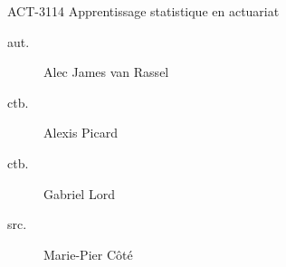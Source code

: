 \begin{contrib}{ACT-3114\: Apprentissage statistique en actuariat}
\begin{description}
	\item[aut.] Alec James van Rassel
	\item[ctb.]	Alexis Picard
	\item[ctb.]	Gabriel Lord
	\item[src.] Marie-Pier Côté
\end{description}
\end{contrib}